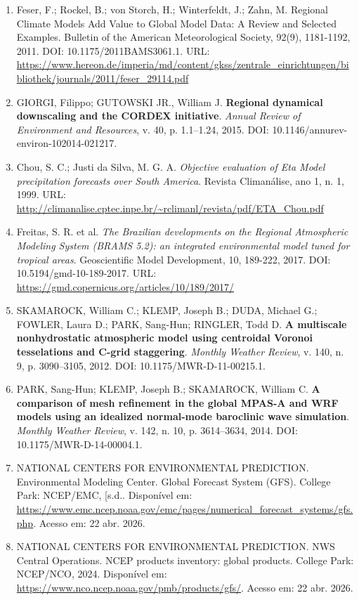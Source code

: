 \documentclass[12pt,a4paper,oneside]{book}
\begin{document}
\begin{enumerate}
\item
  Feser, F.; Rockel, B.; von Storch, H.; Winterfeldt, J.; Zahn, M. Regional Climate Models Add Value to Global Model Data: A Review and Selected Examples. Bulletin of the American Meteorological Society, 92(9), 1181-1192, 2011. DOI: 10.1175/2011BAMS3061.1. URL: \url{https://www.hereon.de/imperia/md/content/gkss/zentrale_einrichtungen/bibliothek/journals/2011/feser_29114.pdf}
\item
  GIORGI, Filippo; GUTOWSKI JR., William J. \textbf{Regional dynamical downscaling and the CORDEX initiative}. \emph{Annual Review of Environment and Resources}, v. 40, p. 1.1--1.24, 2015. DOI: 10.1146/annurev-environ-102014-021217.
\item
  Chou, S. C.; Justi da Silva, M. G. A. \emph{Objective evaluation of Eta Model precipitation forecasts over South America}. Revista Climanálise, ano 1, n. 1, 1999. URL: \url{http://climanalise.cptec.inpe.br/~rclimanl/revista/pdf/ETA_Chou.pdf}
\item
  Freitas, S. R. et al. \emph{The Brazilian developments on the Regional Atmospheric Modeling System (BRAMS 5.2): an integrated environmental model tuned for tropical areas}. Geoscientific Model Development, 10, 189-222, 2017. DOI: 10.5194/gmd-10-189-2017. URL: \url{https://gmd.copernicus.org/articles/10/189/2017/}
\item
  SKAMAROCK, William C.; KLEMP, Joseph B.; DUDA, Michael G.; FOWLER, Laura D.; PARK, Sang-Hun; RINGLER, Todd D. \textbf{A multiscale nonhydrostatic atmospheric model using centroidal Voronoi tesselations and C-grid staggering}. \emph{Monthly Weather Review}, v. 140, n. 9, p. 3090--3105, 2012. DOI: 10.1175/MWR-D-11-00215.1.
\item
  PARK, Sang-Hun; KLEMP, Joseph B.; SKAMAROCK, William C. \textbf{A comparison of mesh refinement in the global MPAS-A and WRF models using an idealized normal-mode baroclinic wave simulation}. \emph{Monthly Weather Review}, v. 142, n. 10, p. 3614--3634, 2014. DOI: 10.1175/MWR-D-14-00004.1.
\item
  NATIONAL CENTERS FOR ENVIRONMENTAL PREDICTION. Environmental Modeling Center. Global Forecast System (GFS). College Park: NCEP/EMC, {[}s.d.. Disponível em: \url{https://www.emc.ncep.noaa.gov/emc/pages/numerical_forecast_systems/gfs.php}. Acesso em: 22 abr. 2026.
\item
  NATIONAL CENTERS FOR ENVIRONMENTAL PREDICTION. NWS Central Operations. NCEP products inventory: global products. College Park: NCEP/NCO, 2024. Disponível em: \url{https://www.nco.ncep.noaa.gov/pmb/products/gfs/}. Acesso em: 22 abr. 2026.

\end{enumerate}
\end{document}
